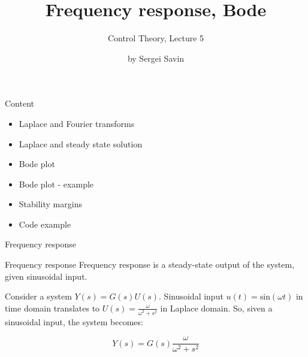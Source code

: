 \documentclass{beamer}
\title{Frequency response, Bode}
\subtitle{Control Theory, Lecture 5}
\author{by Sergei Savin}
\date{\mydate}
\begin{document}
\maketitle


\begin{frame}{Content}

\begin{itemize}
\item Laplace and Fourier transforms
\item Laplace and steady state solution
\item Bode plot
\item Bode plot - example
\item Stability margins
\item Code example
\end{itemize}

\end{frame}



\begin{frame}{Frequency response}
	\begin{flushleft}
		
		\begin{block}{Frequency response}
			Frequency response is a steady-state output of the system, given sinusoidal input.
		\end{block}
	
		\bigskip
	
		Consider a system $Y(s) = G(s)U(s)$. Sinusoidal input $u(t) = \text{sin}(\omega t)$ in time domain translates to $U(s) = \frac{\omega}{\omega^2 + s^2}$ in Laplace domain. So, siven a sinusoidal input, the system becomes:
		
		\begin{equation}
			Y(s) = G(s)\frac{\omega}{\omega^2 + s^2}
		\end{equation}
		
	\end{flushleft}
\end{frame}
\end{document}
